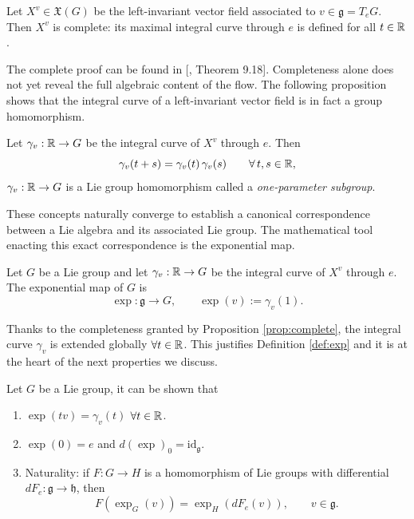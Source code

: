 \begin{proposition}\label{prop:complete}
	Let $X^v \in \mathfrak{X}(G)$ be the left-invariant vector field associated to $v \in \mathfrak{g} = T_eG$. Then $X^v$ is complete: its maximal integral curve through $e$ is defined for all $t \in \mathbb{R}$.
\end{proposition}

The complete proof can be found in [\cite{leeIntroductionSmoothManifolds2013}, Theorem 9.18]. Completeness alone does not yet reveal the full algebraic content of the flow. The following proposition shows that the integral curve of a left-invariant vector field is in fact a group homomorphism.

\begin{proposition}\label{prop:one-param}
	Let $\gamma_v:\mathbb{R}\to G$ be the integral curve of $X^v$ through $e$. Then
	\[
	\gamma_v(t+s) = \gamma_v(t)\,\gamma_v(s) \qquad \forall\, t,s \in \mathbb{R},
	\]
	$\gamma_v :\mathbb{R} \to G$ is a Lie group homomorphism called a \emph{one-parameter subgroup}.
\end{proposition}

These concepts naturally converge to establish a canonical correspondence between a Lie algebra and its associated Lie group. The mathematical tool enacting this exact correspondence is the exponential map.

\begin{definition}\label{def:exp}
	Let $G$ be a Lie group and let $\gamma_v:\mathbb{R} \to G$ be the integral curve of $X^v$ through $e$. The exponential map of $G$ is
	\[
	\exp: \mathfrak{g} \to G, \qquad \exp(v) := \gamma_v(1).
	\]
\end{definition}

Thanks to the completeness granted by Proposition \ref{prop:complete}, the integral curve $\gamma_v$ is extended globally $\forall t \in \mathbb{R}$. This justifies Definition \ref{def:exp} and it is at the heart of the next properties we discuss.

\begin{proposition}\label{prop:exp-props}
	Let $G$ be a Lie group, it can be shown that
	\begin{enumerate}
		\item $\exp(tv) = \gamma_v(t)$ $\forall t\in\mathbb{R}$.
		\item $\exp(0)=e$ and $d(\exp)_0 = \mathrm{id}_{\mathfrak g}$.
		\item Naturality: if $F:G\to H$ is a homomorphism of Lie groups with differential $dF_e:\mathfrak g\to\mathfrak h$, then
		\[
		F(\exp_G(v)) = \exp_H(dF_e(v)), \qquad v\in\mathfrak g.
		\]
	\end{enumerate}
\end{proposition}

